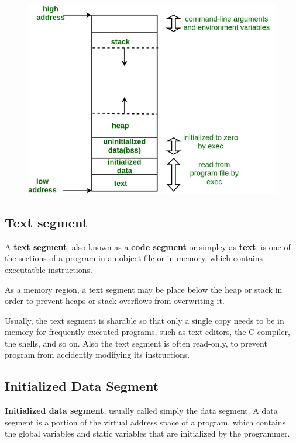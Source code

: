 \documentclass[a5paper,pagesize,10pt,bibtotoc,pointlessnumbers,
normalheadings,DIV=9,twoside=false]{scrbook}
\begin{document}
\begin{figure}[!htb]
	\centering
	\includegraphics[width=\textwidth]{pictures/memoryLayoutC.jpg}
\end{figure}

\subsection{Text segment}
A \textbf{text segment}, also known as a \textbf{code segment} or simpley as \textbf{text},
is one of the sections of a program in an object file or in memory,
which contains executatble instructions.

As a memory region, a text segment may be place below the heap or stack 
in order to prevent heaps or stack overflows from overwriting it.

Usually, the text segment is sharable so that only a single copy needs to be 
in memory for frequently executed programs, such as text editors, the C compiler, 
the shells, and so on. Also the text segment is often read-only, to prevent program
from accidently modifying its instructions.


\subsection{Initialized Data Segment}
\textbf{Initialized data segment}, usually called simply the data segment. 
A data segment is a portion of the virtual address space of a program, 
which contains the global variables and static variables that are initialized by the programmer.
\end{document}
